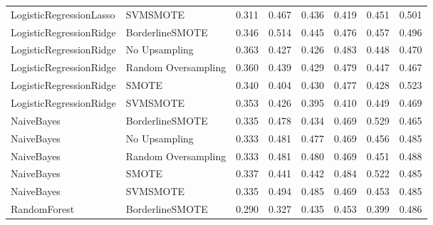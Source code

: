 \begin{tabular}{llllllll}
     LogisticRegressionLasso &            SVMSMOTE & 0.311 &                     0.467 &                 0.436 &                  0.419 &                                   0.451 &     0.501 \\
     LogisticRegressionRidge &     BorderlineSMOTE & 0.346 &                     0.514 &                 0.445 &                  0.476 &                                   0.457 &     0.496 \\
     LogisticRegressionRidge &       No Upsampling & 0.363 &                     0.427 &                 0.426 &                  0.483 &                                   0.448 &     0.470 \\
     LogisticRegressionRidge & Random Oversampling & 0.360 &                     0.439 &                 0.429 &                  0.479 &                                   0.447 &     0.467 \\
     LogisticRegressionRidge &               SMOTE & 0.340 &                     0.404 &                 0.430 &                  0.477 &                                   0.428 &     0.523 \\
     LogisticRegressionRidge &            SVMSMOTE & 0.353 &                     0.426 &                 0.395 &                  0.410 &                                   0.449 &     0.469 \\
                  NaiveBayes &     BorderlineSMOTE & 0.335 &                     0.478 &                 0.434 &                  0.469 &                                   0.529 &     0.465 \\
                  NaiveBayes &       No Upsampling & 0.333 &                     0.481 &                 0.477 &                  0.469 &                                   0.456 &     0.485 \\
                  NaiveBayes & Random Oversampling & 0.333 &                     0.481 &                 0.480 &                  0.469 &                                   0.451 &     0.488 \\
                  NaiveBayes &               SMOTE & 0.337 &                     0.441 &                 0.442 &                  0.484 &                                   0.522 &     0.485 \\
                  NaiveBayes &            SVMSMOTE & 0.335 &                     0.494 &                 0.485 &                  0.469 &                                   0.453 &     0.485 \\
                RandomForest &     BorderlineSMOTE & 0.290 &                     0.327 &                 0.435 &                  0.453 &                                   0.399 &     0.486 \\

\end{tabular}
